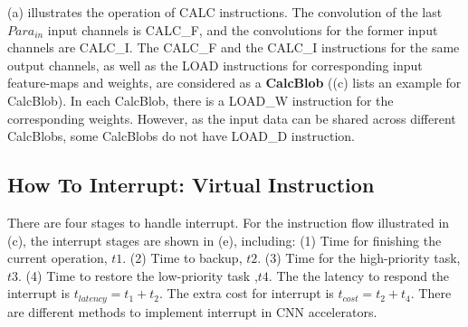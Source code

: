 (a) illustrates the operation of CALC instructions. The convolution of the last $ Para_{in} $ input channels is CALC\_F, and the convolutions for the former input channels are CALC\_I. The CALC\_F and the CALC\_I instructions for the same output channels, as well as the LOAD instructions for corresponding input feature-maps and weights, are considered as a \textbf{CalcBlob}  ((c) lists an example for CalcBlob). In each CalcBlob, there is a LOAD\_W instruction for the corresponding weights. However, as the input data can be shared across different CalcBlobs, some CalcBlobs do not have  LOAD\_D instruction. 








\subsection{How To Interrupt: Virtual Instruction}
\label{sec:howinter}

There are four stages to handle interrupt. For the instruction flow illustrated in (c), the interrupt stages are shown in (e), including: (1) Time for finishing the current operation, $t1$. (2) Time to backup, $t2$. (3) Time for the high-priority task, $t3$. (4) Time to restore the low-priority task ,$t4$. The the latency to respond the interrupt is $t_{latency} = t_1+t_2$. The extra cost for interrupt is $t_{cost}=t_2+t_4$. 
There are different methods to implement interrupt in CNN accelerators.

